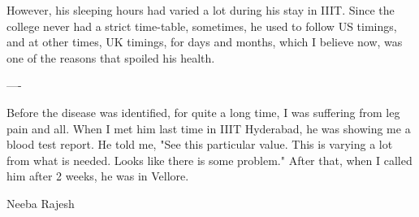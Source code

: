 \begin{english}
\begin{center}
\end{center}
However, his sleeping hours had varied a lot during his stay in IIIT. Since the college never had a strict time-table, sometimes, he used to follow US timings, and at other times, UK timings, for days and months, which I believe now, was one of the reasons that spoiled his health.
\begin{center}
---- 
\end{center}
Before the disease was identified, for quite a long time, I was suffering from leg pain and all. When I met him last time in IIIT Hyderabad, he was showing me a blood test report. He told me, "See this particular value. This is varying a lot from what is needed. Looks like there is some problem." After that, when I called him after 2 weeks, he was in Vellore.

Neeba Rajesh
\end{english}
\newpage
